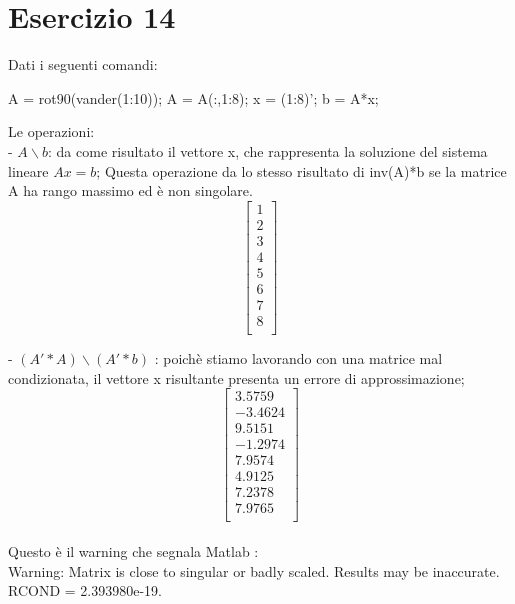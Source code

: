 \section{Esercizio 14}

Dati i seguenti comandi:

A = rot90(vander(1:10));
A = A(:,1:8);
x = (1:8)'; 
b = A*x;

Le operazioni:\\
-  $A \backslash b$: da come risultato il vettore x, che rappresenta la soluzione del sistema lineare $Ax = b$; Questa operazione da lo stesso risultato di  inv(A)*b se la matrice A ha rango massimo ed è non singolare.
\[\begin{bmatrix}
1 \\
2 \\
3 \\
4 \\
5\\
6 \\
7 \\
8\\
\end{bmatrix}\]

- $(A'*A) \backslash(A'* b)$ : poichè stiamo lavorando con una matrice mal condizionata, il vettore x risultante presenta un errore di approssimazione;
\[\begin{bmatrix}
3.5759 \\
-3.4624 \\
9.5151 \\
-1.2974\\
7.9574\\
4.9125\\
7.2378 \\
7.9765\\
\end{bmatrix}\]
\\
Questo è il warning che segnala Matlab :\\
Warning: Matrix is close to singular or badly scaled. Results
may be inaccurate. RCOND =  2.393980e-19. 

